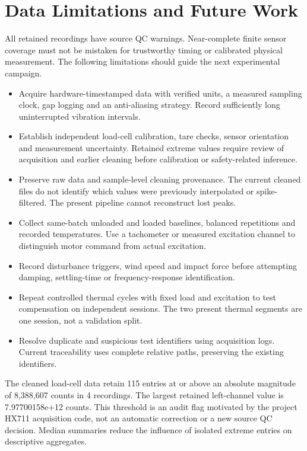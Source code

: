 \documentclass[10pt,letterpaper]{article}
\begin{document}
\section{Data Limitations and Future Work}
All retained recordings have source QC warnings. Near-complete finite sensor coverage must not be mistaken for trustworthy timing or calibrated physical measurement. The following limitations should guide the next experimental campaign.

\begin{itemize}
\item Acquire hardware-timestamped data with verified units, a measured sampling clock, gap logging and an anti-aliasing strategy. Record sufficiently long uninterrupted vibration intervals.
\item Establish independent load-cell calibration, tare checks, sensor orientation and measurement uncertainty. Retained extreme values require review of acquisition and earlier cleaning before calibration or safety-related inference.
\item Preserve raw data and sample-level cleaning provenance. The current cleaned files do not identify which values were previously interpolated or spike-filtered. The present pipeline cannot reconstruct lost peaks.
\item Collect same-batch unloaded and loaded baselines, balanced repetitions and recorded temperatures. Use a tachometer or measured excitation channel to distinguish motor command from actual excitation.
\item Record disturbance triggers, wind speed and impact force before attempting damping, settling-time or frequency-response identification.
\item Repeat controlled thermal cycles with fixed load and excitation to test compensation on independent sessions. The two present thermal segments are one session, not a validation split.
\item Resolve duplicate and suspicious test identifiers using acquisition logs. Current traceability uses complete relative paths, preserving the existing identifiers.
\end{itemize}
The cleaned load-cell data retain 115 entries at or above an absolute magnitude of 8,388,607 counts in 4 recordings. The largest retained left-channel value is 7.97700158e+12 counts. This threshold is an audit flag motivated by the project HX711 acquisition code, not an automatic correction or a new source QC decision. Median summaries reduce the influence of isolated extreme entries on descriptive aggregates.
\end{document}
